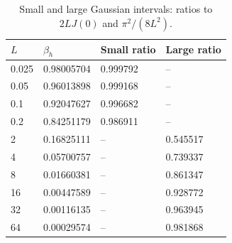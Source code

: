 \begin{table}[htbp]
\centering
\caption{Small and large Gaussian intervals: ratios to $2LJ(0)$ and $\pi^2/(8L^2)$.}
\label{tab:scaling}
\begin{tabular}{llll}
\toprule
$L$ & $\beta_h$ & Small ratio & Large ratio \\
\midrule
0.025 & 0.98005704 & 0.999792 & -- \\
0.05 & 0.96013898 & 0.999168 & -- \\
0.1 & 0.92047627 & 0.996682 & -- \\
0.2 & 0.84251179 & 0.986911 & -- \\
2 & 0.16825111 & -- & 0.545517 \\
4 & 0.05700757 & -- & 0.739337 \\
8 & 0.01660381 & -- & 0.861347 \\
16 & 0.00447589 & -- & 0.928772 \\
32 & 0.00116135 & -- & 0.963945 \\
64 & 0.00029574 & -- & 0.981868 \\
\bottomrule
\end{tabular}
\end{table}
